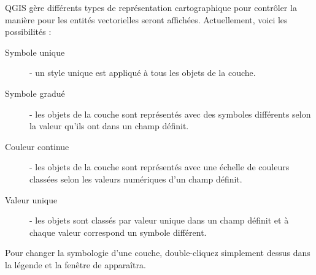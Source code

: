 QGIS gère différents types de représentation cartographique pour contrôler la manière pour les entités vectorielles seront affichées. Actuellement, voici les possibilités :

\begin{description}
\item[Symbole unique] - un style unique est appliqué à tous les objets de la couche.
\item[Symbole gradué] - les objets de la couche sont représentés avec des symboles différents selon la valeur qu'ils ont dans un champ définit.
\item[Couleur continue] - les objets de la couche sont représentés avec une échelle de couleurs classées selon les valeurs numériques d'un champ définit.
\item[Valeur unique] - les objets sont classés par valeur unique dans un champ définit et à chaque valeur correspond un symbole différent.
\end{description}

Pour changer la symbologie d'une couche, double-cliquez simplement dessus dans la légende et la fenêtre de  apparaîtra.

